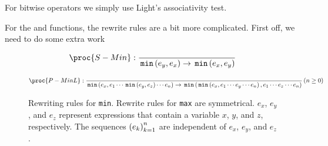 





For bitwise operators we simply use Light's associativity test. 

For the \LMIN{} and \LMAX{} functions, the rewrite rules are a bit more
complicated. First off, we need to do some extra work

\begin{figure*}[htbp!]
\begin{align*}
\proc{S-Min}:{\over \LMIN\p{e_y, e_x} \rightarrow \LMIN\p{e_x,e_y} }
\end{align*}

\begin{align*}
\proc{P-MinL}:{\over \LMIN\p{e_x, e_1 \cdots \LMIN\p{e_y, e_z} \cdots e_n}
\rightarrow \LMIN \p{ \LMIN \p{ e_x, e_1 \cdots e_y \cdots e_n}, e_1 \cdots e_z
\cdots e_n }
}\p{n\geq 0}
\end{align*}

\caption[]{Rewriting rules for \texttt{min}. Rewrite rules for \texttt{max} are
symmetrical. $e_x$, $e_y$, and $e_z$ represent expressions that contain a
variable $x$, $y$, and $z$, respectively.  The sequences $\left({e_k}\right)_{k=1}^n$ are
independent of $e_x$, $e_y$, and $e_z$.} \label{figure:rewriting-logop}
\end{figure*}

